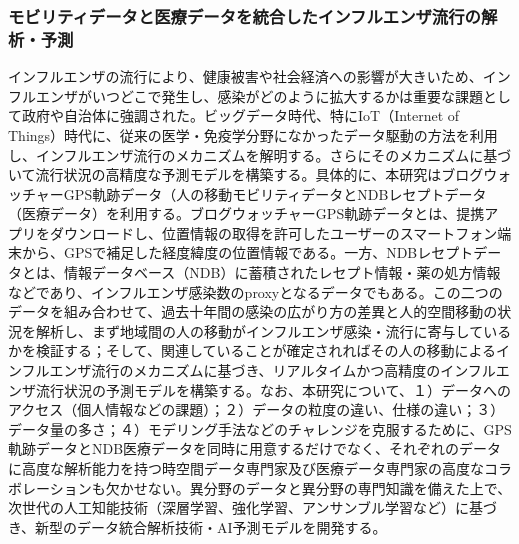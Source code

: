 \subsubsection{モビリティデータと医療データを統合したインフルエンザ流行の解析・予測}
インフルエンザの流行により、健康被害や社会経済への影響が大きいため、インフルエンザがいつどこで発生し、感染がどのように拡大するかは重要な課題として政府や自治体に強調された。ビッグデータ時代、特にIoT（Internet of Things）時代に、従来の医学・免疫学分野になかったデータ駆動の方法を利用し、インフルエンザ流行のメカニズムを解明する。さらにそのメカニズムに基づいて流行状況の高精度な予測モデルを構築する。具体的に、本研究はブログウォッチャーGPS軌跡データ（人の移動モビリティデータとNDBレセプトデータ（医療データ）を利用する。ブログウォッチャーGPS軌跡データとは、提携アプリをダウンロードし、位置情報の取得を許可したユーザーのスマートフォン端末から、GPSで補足した経度緯度の位置情報である。一方、NDBレセプトデータとは、情報データベース（NDB）に蓄積されたレセプト情報・薬の処方情報などであり、インフルエンザ感染数のproxyとなるデータでもある。この二つのデータを組み合わせて、過去十年間の感染の広がり方の差異と人的空間移動の状況を解析し、まず地域間の人の移動がインフルエンザ感染・流行に寄与しているかを検証する；そして、関連していることが確定されればその人の移動によるインフルエンザ流行のメカニズムに基づき、リアルタイムかつ高精度のインフルエンザ流行状況の予測モデルを構築する。なお、本研究について、１）データへのアクセス（個人情報などの課題）；２）データの粒度の違い、仕様の違い；３）データ量の多さ；４）モデリング手法などのチャレンジを克服するために、GPS軌跡データとNDB医療データを同時に用意するだけでなく、それぞれのデータに高度な解析能力を持つ時空間データ専門家及び医療データ専門家の高度なコラボレーションも欠かせない。異分野のデータと異分野の専門知識を備えた上で、次世代の人工知能技術（深層学習、強化学習、アンサンブル学習など）に基づき、新型のデータ統合解析技術・AI予測モデルを開発する。

